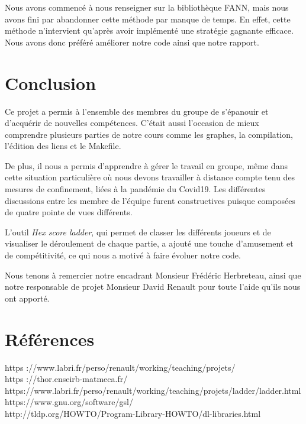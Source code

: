\documentclass[a4paper,10pt]{article}
\begin{document}
Nous avons commencé à nous renseigner sur la bibliothèque FANN, mais nous avons fini par abandonner cette méthode par manque de temps. En effet, cette méthode n'intervient qu'après avoir implémenté une stratégie gagnante efficace. Nous avons donc préféré améliorer notre code ainsi que notre rapport. 


    


\section{Conclusion}
Ce projet a permis à l'ensemble des membres du groupe de s'épanouir et d'acquérir de nouvelles compétences. C'était aussi l'occasion de mieux comprendre plusieurs parties de notre cours comme les graphes, la compilation, l'édition des liens et le Makefile. 
\newline

De plus, il nous a permis d'apprendre à gérer le travail en groupe, même dans cette situation particulière où nous devons travailler à distance  compte tenu des mesures de confinement, liées à la pandémie du Covid19. Les différentes discussions entre les membre de l'équipe furent constructives puisque composées de quatre pointe de vues différents.
\newline

L'outil \textit{Hex score ladder}, qui permet de classer les différents joueurs et de visualiser le déroulement de chaque partie, a ajouté une touche d'amusement et de compétitivité, ce qui nous a motivé à faire  évoluer notre code.
\newline

Nous tenons à remercier notre encadrant  Monsieur Frédéric Herbreteau, ainsi que notre responsable de projet Monsieur David Renault pour toute l'aide qu'ils nous ont apporté.


\section{Références}

https ://www.labri.fr/perso/renault/working/teaching/projets/
\\
\indent https ://thor.enseirb-matmeca.fr/
\\
\indent https://www.labri.fr/perso/renault/working/teaching/projets/ladder/ladder.html
\\
\indent https://www.gnu.org/software/gsl/
\\
\indent http://tldp.org/HOWTO/Program-Library-HOWTO/dl-libraries.html
\end{document}
